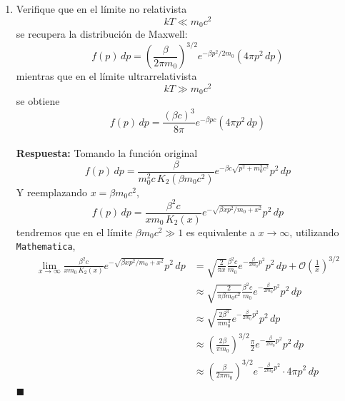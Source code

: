 \documentclass[]{article}
\numberwithin{equation}{section}
\newcommand{\0}{\textcolor{gray}{0}}
\newcommand{\qed}{\hfill\(\blacksquare\)}
\begin{document}
\begin{enumerate}
	\qed
	\item[(b)] Verifique que en el límite no relativista
	\begin{equation}
		kT \ll m_0 c^2
	\end{equation}
	se recupera la distribución de Maxwell:
	\begin{equation}
		f(p) \, dp = \left(\frac{\beta}{2\pi m_0}\right)^{3/2} e^{-\beta p^2 / 2 m_0} (4\pi p^2 \, dp)
	\end{equation}
	mientras que en el límite ultrarrelativista
	\begin{equation}
		kT \gg m_0 c^2
	\end{equation}
	se obtiene
	\begin{equation}
		f(p) \, dp = \frac{(\beta c)^3}{8\pi} e^{-\beta p c} (4\pi p^2 \, dp)
	\end{equation}
	\\
	
	\textbf{Respuesta:} Tomando la función original
	\begin{equation}
		f(p) \, dp = \frac{\beta}{m_0^2 c \, K_2 (\beta m_0 c^2)} e^{-\beta c \sqrt{p^2 + m_0^2 c^2}} p^2 \, dp
	\end{equation}
	Y reemplazando $x = \beta m_0 c^2$,
	\begin{equation}
		f(p) \, dp = \frac{\beta^2 c}{x m_0 \, K_2 (x)} e^{- \sqrt{\beta x p^2/m_0 + x^2}} p^2 \, dp \label{f(p)_x}
	\end{equation}
	tendremos que en el límite $\beta m_0 c^2 \gg 1$ es equivalente a $x \rightarrow \infty$, utilizando \texttt{Mathematica},
	\begin{align}
		\lim_{x \rightarrow \infty} \frac{\beta^2 c}{x m_0 \, K_2 (x)} e^{- \sqrt{\beta x p^2/m_0 + x^2}} p^2 \, dp &= \sqrt{\frac{2}{\pi x}} \frac{\beta^2 c}{m_0}  e^{-\frac{\beta}{2 m_0} p^2} p^2 \, dp + \mathcal{O}\left(\frac{1}{x}\right)^{3/2} \nonumber\\
		&\approx \sqrt{\frac{2}{\pi \beta m_0 c^2}} \frac{\beta^2 c}{m_0}  e^{-\frac{\beta}{2 m_0} p^2} p^2 \, dp \nonumber\\
		&\approx \sqrt{\frac{2 \beta^3}{\pi m_0^3}}  e^{-\frac{\beta}{2 m_0} p^2} p^2 \, dp \nonumber\\
		&\approx \left(\frac{2 \beta}{\pi m_0}\right)^{3/2} \frac{\pi}{2} e^{-\frac{\beta}{2 m_0} p^2} p^2 \, dp \nonumber\\
		&\approx \left(\frac{\beta}{2 \pi m_0}\right)^{3/2} e^{-\frac{\beta}{2 m_0} p^2} \cdot 4 \pi p^2 \, dp
	\end{align}
	\qed
	

\end{enumerate}
\end{document}
